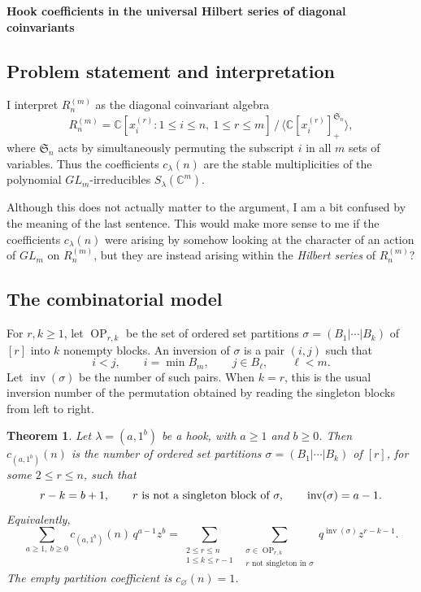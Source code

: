 \documentclass[12pt]{article}
\newtheorem{theorem}{Theorem}
\newcommand{\OP}{\operatorname{OP}}
\newcommand{\inv}{\operatorname{inv}}
\newcommand{\review}[1]{\begin{reviewbox}#1\end{reviewbox}}
\begin{document}
\begin{center}
{\bf Hook coefficients in the universal Hilbert series of diagonal coinvariants}
\end{center}

\subsection*{Problem statement and interpretation}

I interpret \(R_n^{(m)}\) as the diagonal coinvariant algebra
\[
 R_n^{(m)}=\mathbb C[x_i^{(r)}:1\le i\le n,\ 1\le r\le m]\,
/\,\langle \mathbb C[x_i^{(r)}]^{\mathfrak S_n}_{+}\rangle,
\]
where \(\mathfrak S_n\) acts by simultaneously permuting the subscript \(i\) in all
\(m\) sets of variables.  Thus the coefficients \(c_\lambda(n)\) are the stable
multiplicities of the polynomial \(GL_m\)-irreducibles \(S_\lambda(\mathbb C^m)\).
\review{Although this does not actually matter to the argument, I am a bit confused by the meaning of the last sentence. This would make more sense to me if the coefficients $c_\lambda(n)$ were arising by somehow looking at the character of an action of $GL_m$ on $R_n^{(m)}$, but they are instead arising within the \textit{Hilbert series} of $R_n^{(m)}$?}

\subsection*{The combinatorial model}

For \(r,k\ge 1\), let \(\OP_{r,k}\) be the set of ordered set partitions
\(\sigma=(B_1|\cdots|B_k)\) of \([r]\) into \(k\) nonempty blocks.  An inversion of
\(\sigma\) is a pair \((i,j)\) such that
\[
        i<j,\qquad i=\min B_m,\qquad j\in B_\ell,\qquad \ell<m .
\]
Let \(\inv(\sigma)\) be the number of such pairs.  When \(k=r\), this is the
usual inversion number of the permutation obtained by reading the singleton
blocks from left to right.

\begin{theorem}
Let \(\lambda=(a,1^b)\) be a hook, with \(a\ge 1\) and \(b\ge 0\).  Then
\(c_{(a,1^b)}(n)\) is the number of ordered set partitions
\(\sigma=(B_1|\cdots|B_k)\) of \([r]\), for some \(2\le r\le n\), such that
\[
        r-k=b+1,\qquad r\hbox{ is not a singleton block of }\sigma,\qquad
        \inv(\sigma)=a-1 .
\]
Equivalently,
\[
\sum_{a\ge1,\ b\ge0} c_{(a,1^b)}(n)\,q^{a-1}z^b
=
\sum_{\substack{2\le r\le n\\1\le k\le r-1}}
\ \sum_{\substack{\sigma\in \OP_{r,k}\\
                  r\text{ not singleton in }\sigma}}
        q^{\inv(\sigma)}z^{r-k-1}.
\]
The empty partition coefficient is \(c_{\varnothing}(n)=1\).
\end{theorem}
\end{document}
